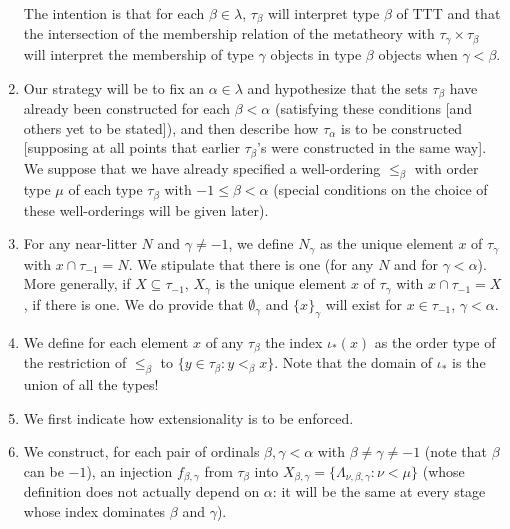 \documentclass[12pt]{article}
\begin{document}
\begin{enumerate}
The intention is that for each $\beta \in \lambda$, $\tau_\beta$ will interpret type $\beta$ of TTT and that the intersection of the membership relation of the metatheory with $\tau_\gamma \times \tau_\beta$ will interpret the membership of type $\gamma$ objects in type $\beta$ objects when $\gamma<\beta$.

\item Our strategy will be to fix an $\alpha\in \lambda$ and hypothesize that the sets $\tau_\beta$ have already been constructed for each $\beta<\alpha$ (satisfying these conditions [and others yet to be stated]), and then describe how $\tau_\alpha$ is to be constructed [supposing at all points that earlier $\tau_\beta$'s were constructed in the same way].   We suppose that we have already specified
a well-ordering $\leq_\beta$ with order type $\mu$ of each type $\tau_\beta$ with $-1\leq \beta <\alpha$ (special conditions on the choice of these well-orderings will be given later).   

\item For any near-litter $N$ and $\gamma\neq -1$, we define $N_\gamma$ as the unique element $x$  of $\tau_\gamma$ with $x \cap \tau_{-1} = N$.  We stipulate that there is one (for any $N$ and for $\gamma<\alpha$).  More generally, if
$X \subseteq \tau_{-1}$, $X_\gamma$ is the unique element $x$ of $\tau_\gamma$ with $x \cap \tau_{-1} = X$, if there is one.  We do provide that $\emptyset_\gamma$ and $\{x\}_\gamma$ will exist
for $x \in \tau_{-1}$, $\gamma<\alpha$.

\item We define for each element $x$ of any $\tau_\beta$ the index $\iota_*(x)$
as the order type of the restriction of $\leq_\beta$ to $\{y \in \tau_\beta:y <_\beta x\}$.  Note that the domain of $\iota_*$ is the union of all the types!

\item We first indicate how extensionality is to be enforced.  

\item We construct, for each pair of ordinals $\beta,\gamma<\alpha$ with $\beta \neq \gamma\neq -1$ (note that $\beta$ can be $-1$),  an injection $f_{\beta,\gamma}$ from $\tau_\beta$ into $X_{\beta,\gamma} = \{\Lambda_{\nu,\beta,\gamma}:\nu<\mu\}$  (whose definition does not actually depend on $\alpha$:  it will be the same at every stage whose index dominates $\beta$ and $\gamma$).


\end{enumerate}
\end{document}
